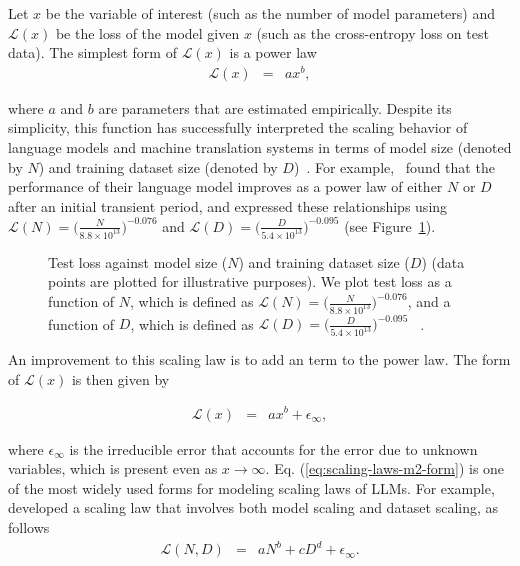 Let $x$ be the variable of interest (such as the number of model parameters) and $\mathcal{L}(x)$ be the loss of the model given $x$ (such as the cross-entropy loss on test data). The simplest form of $\mathcal{L}(x)$ is a power law
\begin{eqnarray}
\mathcal{L}(x) & = & ax^b,
\end{eqnarray}

\noindent where $a$ and $b$ are parameters that are estimated empirically. Despite its simplicity, this function has successfully interpreted the scaling behavior of language models and machine translation systems in terms of model size (denoted by $N$) and training dataset size (denoted by $D$)~\cite{gordon-etal:2021data,hestness-etal:2017deep}. For example,~\citet{kaplan-etal:2020scaling} found that the performance of their language model improves as a power law of either $N$ or $D$ after an initial transient period, and expressed these relationships using $\mathcal{L}(N) = \big( \frac{N}{8.8 \times 10^{13}} \big)^{-0.076}$ and $\mathcal{L}(D) = \big( \frac{D}{5.4 \times 10^{13}} \big)^{-0.095}$ (see Figure~\ref{fig:power-law-scaling-for-model-size-and-dataset-size}).

\begin{figure}[!t]
\centering

\caption{Test loss against model size ($N$) and training dataset size ($D$) (data points are plotted for illustrative purposes). We plot test loss as a function of $N$, which is defined as $\mathcal{L}(N) = \big( \frac{N}{8.8 \times 10^{13}} \big)^{-0.076}$, and a function of $D$, which is defined as $\mathcal{L}(D) = \big( \frac{D}{5.4 \times 10^{13}} \big)^{-0.095}$ ~\cite{kaplan-etal:2020scaling}. }
\label{fig:power-law-scaling-for-model-size-and-dataset-size}
\end{figure}

An improvement to this scaling law is to add an  term to the power law. The form of $\mathcal{L}(x)$ is then given by

\begin{eqnarray}
\mathcal{L}(x) & = & ax^b + \epsilon_{\infty} \label{eq:scaling-laws-m2-form},
\end{eqnarray}

\noindent where $\epsilon_{\infty}$ is the irreducible error that accounts for the error due to unknown variables, which is present even as $x \to \infty$. Eq. (\ref{eq:scaling-laws-m2-form}) is one of the most widely used forms for modeling scaling laws of LLMs. For example,~\citet{rosenfeld-etal:2020constructive} developed a scaling law that involves both model scaling and dataset scaling, as follows
\begin{eqnarray}
\mathcal{L}(N,D) & = & aN^b + cD^d + \epsilon_{\infty}.
\end{eqnarray}


